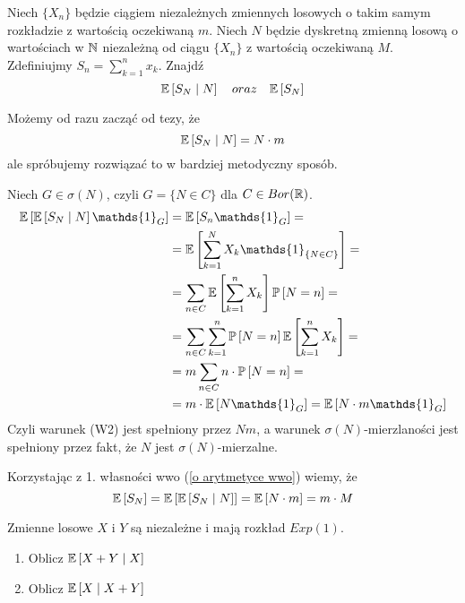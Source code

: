 \begin{problem}
  Niech $\{X_n\}$ będzie ciągiem niezależnych zmiennych losowych o takim samym rozkładzie z wartością oczekiwaną $m$. Niech $N$ będzie dyskretną zmienną losową o wartościach w $\operatorname{\mathbb{N}}$ niezależną od ciągu $\{X_n\}$ z wartością oczekiwaną $M$. Zdefiniujmy $S_n=\sum_{k=1}^nx_k$. Znajdź
  $$\expected{S_N}{N}\quad oraz\quad \expected{S_N}$$
\end{problem}

\begin{solution}
  Możemy od razu zacząć od tezy, że
  $$\expected{S_N}{N}=N\cdot m$$
  ale spróbujemy rozwiązać to w bardziej metodyczny sposób.

  Niech $G\in\sigma(N)$, czyli $G=\{N\in C\}$ dla $C\in Bor(\operatorname{\mathbb{R}})$.
  \begin{align*}
    \expected{\expected{S_N}{N}\mathds{1}_G}&=\expected{S_n\mathds{1}_G}=\\ 
                                            &=\expected{\sum_{k=1}^NX_k\mathds{1}_{\{N\in C\}}}=\\ 
                                            &=\sum_{n\in C}\expected{\sum_{k=1}^nX_k}\prob{N=n}=\\ 
                                            &=\sum_{n\in C}\sum_{k=1}^n\prob{N=n}\expected{\sum_{k=1}^nX_k}=\\ 
                                            &=m\sum_{n\in C}n\cdot \prob{N=n}=\\ 
                                            &=m\cdot\expected{N\mathds{1}_G}=\expected{N\cdot m\mathds{1}_G}
  \end{align*}
  Czyli warunek (W2) jest spełniony przez $Nm$, a warunek $\sigma(N)$-mierzlaności jest spełniony przez fakt, że $N$ jest $\sigma(N)$-mierzalne.

  Korzystając z 1. własności wwo (\ref{o arytmetyce wwo}) wiemy, że
  $$\expected{S_N}=\expected{\expected{S_N}{N}}=\expected{N\cdot m}=m\cdot M$$
\end{solution}

\begin{problem}
  Zmienne losowe $X$ i $Y$ są niezależne i mają rozkład $Exp(1)$. 
  \begin{enumerate}[label=(\alph*)]
    \item Oblicz $\expected{X+Y}{X}$
    \item Oblicz $\expected{X}{X+Y}$
  \end{enumerate}
\end{problem}

